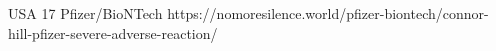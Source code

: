           {USA}
          {17}
          {Pfizer/BioNTech}
          {}
          {
          }
          {https://nomoresilence.world/pfizer-biontech/connor-hill-pfizer-severe-adverse-reaction/}

